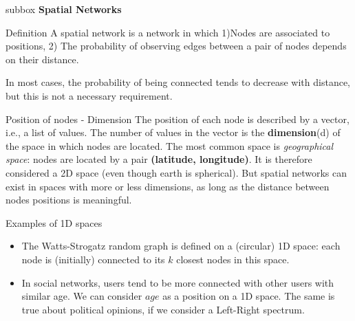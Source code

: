 \documentclass[a4paper,11pt]{book}
\begin{document}

\newpage



\begin{subbox}{subbox}{}
\centering
\Large{\textbf{Spatial Networks}}
\end{subbox}




\begin{textbox}{Definition}
A spatial network is a network in which 1)Nodes are associated to positions, 2) The probability of observing edges between a pair of nodes depends on their distance.

In most cases, the probability of being connected tends to decrease with distance, but this is not a necessary requirement.

\end{textbox}


\begin{textbox}{Position of nodes - Dimension}
The position of each node is described by a vector, i.e., a list of values. The number of values in the vector is the \textbf{dimension}(d) of the space in which nodes are located. The most common space is \textit{geographical space}: nodes are located by a pair \textbf{(latitude, longitude)}. It is therefore considered a 2D space (even though earth is spherical). But spatial networks can exist in spaces with more or less dimensions, as long as the distance between nodes positions is meaningful.
\end{textbox}


\begin{textbox}{Examples of 1D spaces}
\begin{itemize}
    \item The Watts-Strogatz random graph is defined on a (circular) 1D space: each node is (initially) connected to its $k$ closest nodes in this space. 
    \item In social networks, users tend to be more connected with other users with similar age. We can consider $age$ as a position on a 1D space. The same is true about political opinions, if we consider a Left-Right spectrum.
\end{itemize}
\end{textbox}
\end{document}
